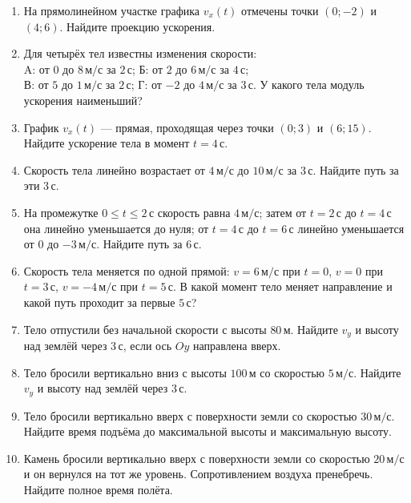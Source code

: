 \documentclass[a4paper,12pt]{article}
\newcommand{\ms}{\,\text{м/с}}
\newcommand{\metr}{\,\text{м}}
\newcommand{\secnd}{\,\text{с}}
\begin{document}
\begin{enumerate}[label=\textbf{\arabic*.}]
  \item На прямолинейном участке графика $v_x(t)$ отмечены точки $(0; -2)$ и $(4; 6)$. Найдите проекцию ускорения.

  \item Для четырёх тел известны изменения скорости:\\
  A: от $0$ до $8\ms$ за $2\secnd$;\quad
  Б: от $2$ до $6\ms$ за $4\secnd$;\\
  В: от $5$ до $1\ms$ за $2\secnd$;\quad
  Г: от $-2$ до $4\ms$ за $3\secnd$.
  У какого тела модуль ускорения наименьший?

  \item График $v_x(t)$ — прямая, проходящая через точки $(0;3)$ и $(6;15)$. Найдите ускорение тела в момент $t=4\secnd$.

  \item Скорость тела линейно возрастает от $4\ms$ до $10\ms$ за $3\secnd$. Найдите путь за эти $3\secnd$.

  \item На промежутке $0\le t\le2\secnd$ скорость равна $4\ms$; затем от $t=2\secnd$ до $t=4\secnd$ она линейно уменьшается до нуля; от $t=4\secnd$ до $t=6\secnd$ линейно уменьшается от $0$ до $-3\ms$. Найдите путь за $6\secnd$.

  \item Скорость тела меняется по одной прямой: $v=6\ms$ при $t=0$, $v=0$ при $t=3\secnd$, $v=-4\ms$ при $t=5\secnd$. В какой момент тело меняет направление и какой путь проходит за первые $5\secnd$?

  \item Тело отпустили без начальной скорости с высоты $80\metr$. Найдите $v_y$ и высоту над землёй через $3\secnd$, если ось $Oy$ направлена вверх.

  \item Тело бросили вертикально вниз с высоты $100\metr$ со скоростью $5\ms$. Найдите $v_y$ и высоту над землёй через $3\secnd$.

  \item Тело бросили вертикально вверх с поверхности земли со скоростью $30\ms$. Найдите время подъёма до максимальной высоты и максимальную высоту.

  \item Камень бросили вертикально вверх с поверхности земли со скоростью $20\ms$ и он вернулся на тот же уровень. Сопротивлением воздуха пренебречь. Найдите полное время полёта.
\end{enumerate}
\end{document}
